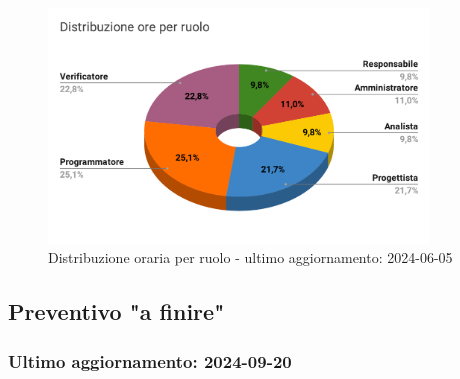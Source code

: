 \begin{figure}[H]
  \centering
  \includegraphics[width=0.90\textwidth]{assets/Preventivo/Totale/distribuzione_ore_ruolo.pdf}
  \caption{Distribuzione oraria per ruolo - ultimo aggiornamento: 2024-06-05}
\end{figure}

\subsection{Preventivo "a finire"}\label{sec:preventivo-a-finire}
\subsubsection{Ultimo aggiornamento: 2024-09-20}

